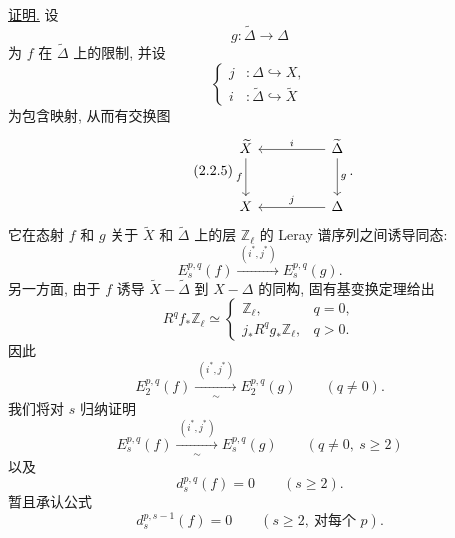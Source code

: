 \noindent\underline{证明.}
设
\begin{equation}\tag{2.2.3}
g:\widetilde\Delta\longrightarrow\Delta
\end{equation}
为 $f$ 在 $\widetilde\Delta$ 上的限制, 并设
\begin{equation}\tag{2.2.4}
\left\{
\begin{aligned}
j&:\Delta\hookrightarrow X,\\
i&:\widetilde\Delta\hookrightarrow\widetilde X
\end{aligned}
\right.
\end{equation}
为包含映射, 从而有交换图
\begin{equation}\tag{2.2.5}
\begin{tikzcd}[column sep=huge,row sep=large]
\widetilde X \arrow[d,"f"'] &
\widetilde\Delta \arrow[l,"i"'] \arrow[d,"g"]\\
X & \Delta \arrow[l,"j"']
\end{tikzcd}.
\end{equation}
它在态射 $f$ 和 $g$ 关于 $\widetilde X$ 和 $\widetilde\Delta$ 上的层 $\mathbb Z_\ell$ 的 Leray 谱序列之间诱导同态:
\begin{equation}\tag{2.2.6}
E_s^{p,q}(f)\xrightarrow{\ (i^*,j^*)\ }E_s^{p,q}(g).
\end{equation}
另一方面, 由于 $f$ 诱导 $\widetilde X-\widetilde\Delta$ 到 $X-\Delta$ 的同构, 固有基变换定理给出
\begin{equation}\tag{2.2.7}
R^qf_*\mathbb Z_\ell\simeq
\begin{cases}
\mathbb Z_\ell,&q=0,\\[1ex]
j_*R^qg_*\mathbb Z_\ell,&q>0.
\end{cases}
\end{equation}
因此
\begin{equation}\tag{2.2.8}
E_2^{p,q}(f)
\xrightarrow[\ \sim\ ]{\ (i^*,j^*)\ }
E_2^{p,q}(g)
\qquad(q\ne0).
\end{equation}
我们将对 $s$ 归纳证明
\begin{equation}\tag{2.2.9}
E_s^{p,q}(f)
\xrightarrow[\ \sim\ ]{\ (i^*,j^*)\ }
E_s^{p,q}(g)
\qquad(q\ne0,\ s\geq2)
\end{equation}
以及
\begin{equation}\tag{2.2.10}
d_s^{p,q}(f)=0\qquad(s\geq2).
\end{equation}
暂且承认公式
\begin{equation}\tag{2.2.11}
d_s^{p,s-1}(f)=0\qquad(s\geq2,\ \text{对每个 }p).
\end{equation}

